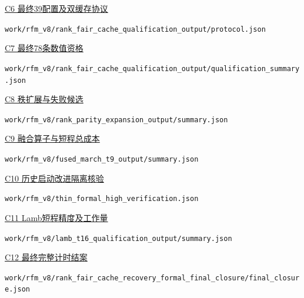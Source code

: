 \noindent\href{https://github.com/LStar404/rfm-navier-stokes-research/blob/6f2b3500964d3d5153b8400018236c4702ef94f8/work/rfm_v8/rank_fair_cache_qualification_output/protocol.json}{C6 最终39配置及双缓存协议}\par\nopagebreak
{\small\nolinkurl{work/rfm_v8/rank_fair_cache_qualification_output/protocol.json}}\par\smallskip

\noindent\href{https://github.com/LStar404/rfm-navier-stokes-research/blob/6f2b3500964d3d5153b8400018236c4702ef94f8/work/rfm_v8/rank_fair_cache_qualification_output/qualification_summary.json}{C7 最终78条数值资格}\par\nopagebreak
{\small\nolinkurl{work/rfm_v8/rank_fair_cache_qualification_output/qualification_summary.json}}\par\smallskip

\noindent\href{https://github.com/LStar404/rfm-navier-stokes-research/blob/6f2b3500964d3d5153b8400018236c4702ef94f8/work/rfm_v8/rank_parity_expansion_output/summary.json}{C8 秩扩展与失败候选}\par\nopagebreak
{\small\nolinkurl{work/rfm_v8/rank_parity_expansion_output/summary.json}}\par\smallskip

\noindent\href{https://github.com/LStar404/rfm-navier-stokes-research/blob/6f2b3500964d3d5153b8400018236c4702ef94f8/work/rfm_v8/fused_march_t9_output/summary.json}{C9 融合算子与短程总成本}\par\nopagebreak
{\small\nolinkurl{work/rfm_v8/fused_march_t9_output/summary.json}}\par\smallskip

\noindent\href{https://github.com/LStar404/rfm-navier-stokes-research/blob/6f2b3500964d3d5153b8400018236c4702ef94f8/work/rfm_v8/thin_formal_high_verification.json}{C10 历史启动改进隔离核验}\par\nopagebreak
{\small\nolinkurl{work/rfm_v8/thin_formal_high_verification.json}}\par\smallskip

\noindent\href{https://github.com/LStar404/rfm-navier-stokes-research/blob/6f2b3500964d3d5153b8400018236c4702ef94f8/work/rfm_v8/lamb_t16_qualification_output/summary.json}{C11 Lamb短程精度及工作量}\par\nopagebreak
{\small\nolinkurl{work/rfm_v8/lamb_t16_qualification_output/summary.json}}\par\smallskip

\noindent\href{https://github.com/LStar404/rfm-navier-stokes-research/blob/6f2b3500964d3d5153b8400018236c4702ef94f8/work/rfm_v8/rank_fair_cache_recovery_formal_final_closure/final_closure.json}{C12 最终完整计时结案}\par\nopagebreak
{\small\nolinkurl{work/rfm_v8/rank_fair_cache_recovery_formal_final_closure/final_closure.json}}\par\smallskip

